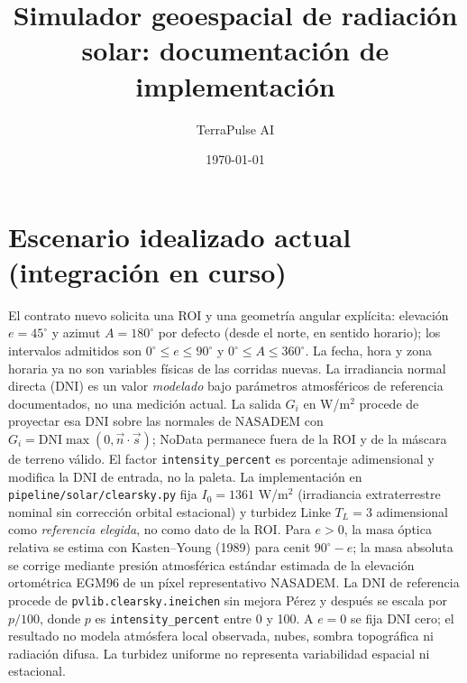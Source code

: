 \documentclass[11pt,a4paper]{article}
\title{Simulador geoespacial de radiación solar: documentación de implementación}
\author{TerraPulse AI}
\date{\today}
\begin{document}
\maketitle

\section{Escenario idealizado actual (integración en curso)}
El contrato nuevo solicita una ROI y una geometría angular explícita: elevación $e=45^\circ$ y azimut $A=180^\circ$ por defecto (desde el norte, en sentido horario); los intervalos admitidos son $0^\circ\leq e\leq90^\circ$ y $0^\circ\leq A\leq360^\circ$. La fecha, hora y zona horaria ya no son variables físicas de las corridas nuevas. La irradiancia normal directa (DNI) es un valor \emph{modelado} bajo parámetros atmosféricos de referencia documentados, no una medición actual. La salida $G_i$ en W/m$^2$ procede de proyectar esa DNI sobre las normales de NASADEM con $G_i=\mathrm{DNI}\max(0,\vec n\cdot\vec s)$; NoData permanece fuera de la ROI y de la máscara de terreno válido. El factor \texttt{intensity\_percent} es porcentaje adimensional y modifica la DNI de entrada, no la paleta. La implementación en \texttt{pipeline/solar/clearsky.py} fija $I_0=1361$ W/m$^2$ (irradiancia extraterrestre nominal sin corrección orbital estacional) y turbidez Linke $T_L=3$ adimensional como \emph{referencia elegida}, no como dato de la ROI. Para $e>0$, la masa óptica relativa se estima con Kasten--Young (1989) para cenit $90^\circ-e$; la masa absoluta se corrige mediante presión atmosférica estándar estimada de la elevación ortométrica EGM96 de un píxel representativo NASADEM. La DNI de referencia procede de \texttt{pvlib.clearsky.ineichen} sin mejora Pérez y después se escala por $p/100$, donde $p$ es \texttt{intensity\_percent} entre 0 y 100. A $e=0$ se fija DNI cero; el resultado no modela atmósfera local observada, nubes, sombra topográfica ni radiación difusa. La turbidez uniforme no representa variabilidad espacial ni estacional.\par
\end{document}
